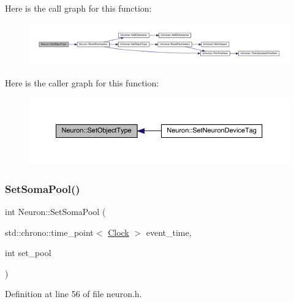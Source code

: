 Here is the call graph for this function\+:
\nopagebreak
\begin{figure}[H]
\begin{center}
\leavevmode
\includegraphics[width=350pt]{class_neuron_ab371e2dacf2cdde8db5547b72fb45ca1_cgraph}
\end{center}
\end{figure}
Here is the caller graph for this function\+:
\nopagebreak
\begin{figure}[H]
\begin{center}
\leavevmode
\includegraphics[width=350pt]{class_neuron_ab371e2dacf2cdde8db5547b72fb45ca1_icgraph}
\end{center}
\end{figure}
\mbox{\label{class_neuron_a14bef0cc064213659b38c93b002e8956}} 
\subsubsection{\texorpdfstring{Set\+Soma\+Pool()}{SetSomaPool()}}
{\footnotesize\ttfamily int Neuron\+::\+Set\+Soma\+Pool (\begin{DoxyParamCaption}\item[{std\+::chrono\+::time\+\_\+point$<$ \hyperlink{universe_8h_a0ef8d951d1ca5ab3cfaf7ab4c7a6fd80}{Clock} $>$}]{event\+\_\+time,  }\item[{int}]{set\+\_\+pool }\end{DoxyParamCaption})\hspace{0.3cm}{\ttfamily [inline]}}



Definition at line 56 of file neuron.\+h.

\mbox{\label{class_neuron_abf99856ac41b5c9c4948b3204bbc1590}} 
